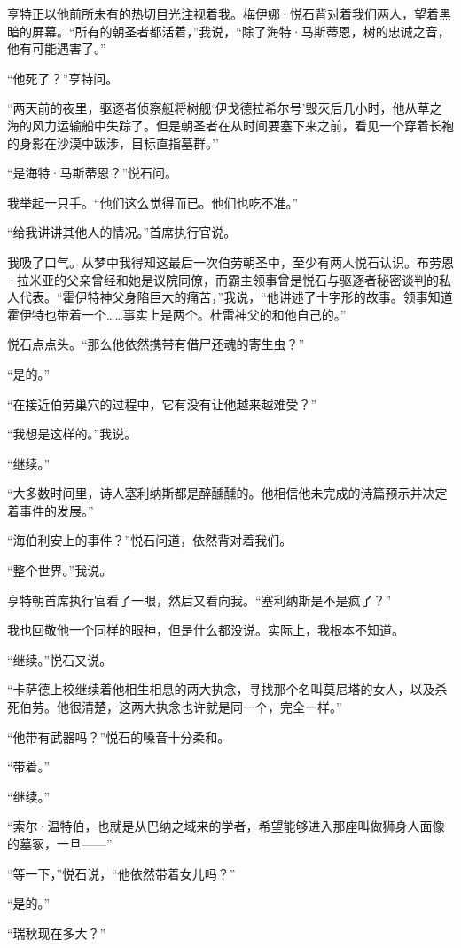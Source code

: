 \documentclass[AutoFakeBold=true]{book}
\begin{document}
亨特正以他前所未有的热切目光注视着我。梅伊娜·悦石背对着我们两人，望着黑暗的屏幕。``所有的朝圣者都活着，''我说，``除了海特·马斯蒂恩，树的忠诚之音，他有可能遇害了。''

``他死了？''亨特问。

``两天前的夜里，驱逐者侦察艇将树舰`伊戈德拉希尔号'毁灭后几小时，他从草之海的风力运输船中失踪了。但是朝圣者在从时间要塞下来之前，看见一个穿着长袍的身影在沙漠中跋涉，目标直指墓群。''

``是海特·马斯蒂恩？''悦石问。

我举起一只手。``他们这么觉得而已。他们也吃不准。''

``给我讲讲其他人的情况。''首席执行官说。

我吸了口气。从梦中我得知这最后一次伯劳朝圣中，至少有两人悦石认识。布劳恩·拉米亚的父亲曾经和她是议院同僚，而霸主领事曾是悦石与驱逐者秘密谈判的私人代表。``霍伊特神父身陷巨大的痛苦，''我说，``他讲述了十字形的故事。领事知道霍伊特也带着一个……事实上是两个。杜雷神父的和他自己的。''

悦石点点头。``那么他依然携带有借尸还魂的寄生虫？''

``是的。''

``在接近伯劳巢穴的过程中，它有没有让他越来越难受？''

``我想是这样的。''我说。

``继续。''

``大多数时间里，诗人塞利纳斯都是醉醺醺的。他相信他未完成的诗篇预示并决定着事件的发展。''

``海伯利安上的事件？''悦石问道，依然背对着我们。

``整个世界。''我说。

亨特朝首席执行官看了一眼，然后又看向我。``塞利纳斯是不是疯了？''

我也回敬他一个同样的眼神，但是什么都没说。实际上，我根本不知道。

``继续。''悦石又说。

``卡萨德上校继续着他相生相息的两大执念，寻找那个名叫莫尼塔的女人，以及杀死伯劳。他很清楚，这两大执念也许就是同一个，完全一样。''

``他带有武器吗？''悦石的嗓音十分柔和。

``带着。''

``继续。''

``索尔·温特伯，也就是从巴纳之域来的学者，希望能够进入那座叫做狮身人面像的墓冢，一旦——''

``等一下，''悦石说，``他依然带着女儿吗？''

``是的。''

``瑞秋现在多大？''
\end{document}
